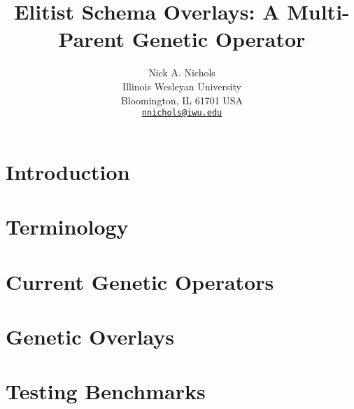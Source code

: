 \documentclass{article}
\makeatletter
\def \papertitle {Elitist Schema Overlays: A Multi-Parent Genetic Operator}
\def \paperauthors {Nick A. Nichols}
\def \paperinstitute {\small Illinois Wesleyan University \\ \small Bloomington, IL 61701 USA}
\def \paperemails {\small\href{mailto:nnichols@iwu.edu}{\nolinkurl{nnichols@iwu.edu}}}
\makeatother
\begin{document}
\title{\papertitle}
\author{\paperauthors \\ \paperinstitute \\ \paperemails}

\maketitle


\begin{abstract}

\end{abstract}








\section{Introduction} 
\label{sec:introduction}



\section{Terminology} 
\label{sec:terminology}



\section{Current Genetic Operators}
\label{sec:current}



\section{Genetic Overlays}
\label{sec:overlays}



\section{Testing Benchmarks}
\label{sec:testfunctions}

\end{document}
